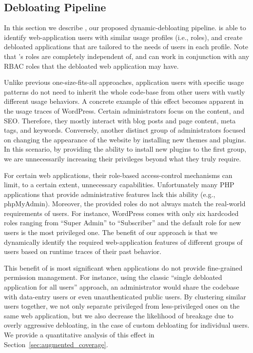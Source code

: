 \subsection{Debloating Pipeline}

In this section we describe \dbltr{}, our proposed dynamic-debloating pipeline. 
\dbltr{} is able to identify web-application users with similar usage profiles (i.e., roles), and create debloated applications that are tailored to the needs of users in each profile. Note that \dbltr{}'s roles are completely independent of, and can work in conjunction with any RBAC roles that the debloated web application may have.


Unlike previous one-size-fits-all approaches, application users with specific usage patterns do not need to inherit the whole code-base from other users with vastly different usage behaviors. 
A concrete example of this effect becomes apparent in the usage traces of WordPress. 
Certain administrators focus on the content, and SEO. 
Therefore, they mostly interact with blog posts and page content, meta tags, and keywords. 
Conversely, another distinct group of administrators focused on changing the appearance of the website by installing new themes and plugins. 
In this scenario, by providing the ability to install new plugins to the first group, we are unnecessarily increasing their privileges beyond what they truly require. 

For certain web applications, their role-based access-control mechanisms can limit, to a certain extent, unnecessary capabilities.
Unfortunately many PHP applications that provide administrative features lack this ability (e.g., phpMyAdmin). 
Moreover, the provided roles do not always match the real-world requirements of users. For instance, WordPress comes with only six hardcoded roles ranging from ``Super Admin'' to ``Subscriber'' and the default role for new users is the most privileged one. 
The benefit of our approach is that we dynamically identify the required web-application features of different groups of users based on runtime traces of their past behavior. 

This benefit of \dbltr{} is most significant when applications do not provide fine-grained permission management. 
For instance, using the classic ``single debloated application for all users'' approach, an administrator would share the codebase with data-entry users or even unauthenticated public users. By clustering similar users together, we not only separate privileged from less-privileged ones on the same web application, but we also decrease the likelihood of breakage due to overly aggressive debloating, in the case of custom debloating for individual users.
We provide a quantitative analysis of this effect in Section~\ref{sec:augmented_coverage}.

